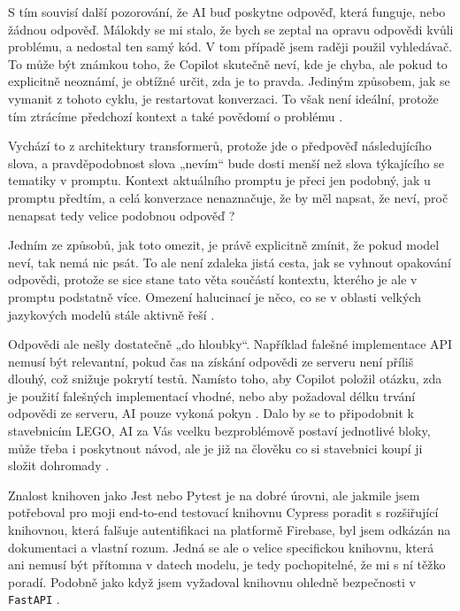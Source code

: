 \documentclass[FM,DP]{tulthesis}
\begin{document}
		S tím souvisí další pozorování, že AI buď poskytne odpověď, která funguje, nebo žádnou odpověď. Málokdy se mi stalo, že bych se zeptal na opravu odpovědi kvůli problému, a nedostal ten samý kód. V tom případě jsem raději použil vyhledávač. To může být známkou toho, že Copilot skutečně neví, kde je chyba, ale pokud to explicitně neoznámí, je obtížné určit, zda je to pravda. Jediným způsobem, jak se vymanit z tohoto cyklu, je restartovat konverzaci. To však není ideální, protože tím ztrácíme předchozí kontext a také povědomí o problému \cite{mocking_fail}.
		
		Vychází to z architektury transformerů, protože jde o předpověď následujícího slova, a pravděpodobnost slova „nevím“ bude dosti menší než slova týkajícího se tematiky v promptu. Kontext aktuálního promptu je přeci jen podobný, jak u promptu předtím, a celá konverzace nenaznačuje, že by měl napsat, že neví, proč nenapsat tedy velice podobnou odpověď \cite{context_understand}? 
		
		Jedním ze způsobů, jak toto omezit, je právě explicitně zmínit, že pokud model neví, tak nemá nic psát. To ale není zdaleka jistá cesta, jak se vyhnout opakování odpovědi, protože se sice stane tato věta součástí kontextu, kterého je ale v promptu podstatně více. Omezení halucinací je něco, co se v oblasti velkých jazykových modelů stále aktivně řeší \cite{jing2024fgaif} .
		
		Odpovědi ale nešly dostatečně „do hloubky“. Například falešné implementace API nemusí být relevantní, pokud čas na získání odpovědi ze serveru není příliš dlouhý, což snižuje pokrytí testů. Namísto toho, aby Copilot položil otázku, zda je použití falešných implementací vhodné, nebo aby požadoval délku trvání odpovědi ze serveru, AI pouze vykoná pokyn \cite{mocking_fail}. Dalo by se to připodobnit k stavebnicím LEGO, AI za Vás vcelku bezproblémově postaví jednotlivé bloky, může třeba i poskytnout návod, ale je již na člověku co si stavebnici koupí ji složit dohromady \cite{testing} \cite{mocking} \cite{mocking_fail}.
		
		Znalost knihoven jako Jest nebo Pytest je na dobré úrovni, ale jakmile jsem potřeboval pro moji end-to-end testovací knihovnu Cypress poradit s rozšiřující knihovnou, která falšuje autentifikaci na platformě Firebase, byl jsem odkázán na dokumentaci a vlastní rozum. Jedná se ale o velice specifickou knihovnu, která ani nemusí být přítomna v datech modelu, je tedy pochopitelné, že mi s ní těžko poradí. Podobně jako když jsem vyžadoval knihovnu ohledně bezpečnosti v \verb|FastAPI| \cite{end2end_fb} \cite{firebase_auth} \cite{firebase} \cite{jest} \cite{pytest} \cite{cypress}. 
		
\end{document}
